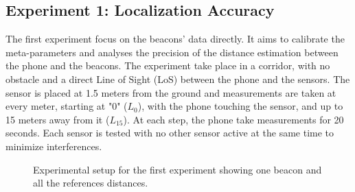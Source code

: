 \subsection{Experiment 1: Localization Accuracy}
\label{exp:1_accuracy}

The first experiment focus on the beacons' data directly. It aims to calibrate the meta-parameters and analyses the precision of the distance estimation between the phone and the beacons. The experiment take place in a corridor, with no obstacle and a direct Line of Sight (LoS) between the phone and the sensors. The sensor is placed at 1.5 meters from the ground and measurements are taken at every meter, starting at "0" ($L_0$), with the phone touching the sensor, and up to 15 meters away from it ($L_{15}$). At each step, the phone take measurements for 20 seconds. Each sensor is tested with no other sensor active at the same time to minimize interferences.

\begin{figure}[H]
    \centering
    \caption{Experimental setup for the first experiment showing one beacon and all the references distances.}
    \label{fig:exp1_setup}
\end{figure}

